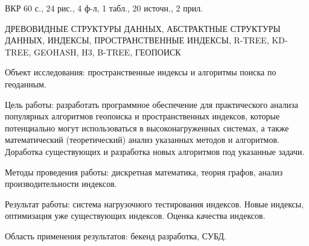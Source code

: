 \Referat %

ВКР 60 с., 24 рис., 4 ф-л, 1 табл., 20 источн., 2 прил. %

\noindent ДРЕВОВИДНЫЕ СТРУКТУРЫ ДАННЫХ, АБСТРАКТНЫЕ СТРУКТУРЫ ДАННЫХ, ИНДЕКСЫ, ПРОСТРАНСТВЕННЫЕ ИНДЕКСЫ, R-TREE, KD-TREE, GEOHASH, H3, B-TREE, ГЕОПОИСК


Объект исследования: пространственные индексы и алгоритмы поиска по геоданным. 

Цель работы: разработать программное обеспечение для практического анализа популярных алгоритмов геопоиска и пространственных индексов, которые потенциально могут использоваться в высоконагруженных системах, а также математический (теоретический) анализ указанных методов и алгоритмов. Доработка существующих и разработка новых алгоритмов под указанные задачи.

Методы проведения работы: дискретная математика, теория графов, анализ производительности индексов. 

Результат работы: система нагрузочного тестирования индексов. Новые индексы, оптимизация уже существующих индексов. Оценка качества индексов. 

Область применения результатов: бекенд разработка, СУБД.



